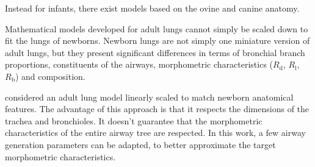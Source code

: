 
Instead for infants, there exist models based on the
ovine\cite{al-jumaily2011} and canine\cite{herrmann2016} anatomy.

Mathematical models developed for adult lungs cannot simply be scaled
down to fit the lungs of newborns. Newborn lungs are not
simply one miniature version of adult lungs, but they present
significant differences in terms of bronchial branch proportions,
constituents of the airways\cite{merkus1996}, morphometric
characteristics ($R_{\text{d}}$, $R_{\text{l}}$,
$R_{\text{b}}$)\cite{horsfield1987} and composition\cite{hislop1989}.

\textcite{mani2020} considered an adult lung model linearly scaled to
match newborn anatomical features.  The advantage of this approach is
that it respects the dimensions of the trachea and bronchioles. It doesn't
guarantee that the morphometric characteristics of the entire airway
tree are respected.  In this work, a few airway generation
parameters can be adapted, to better approximate
the target morphometric characteristics.


